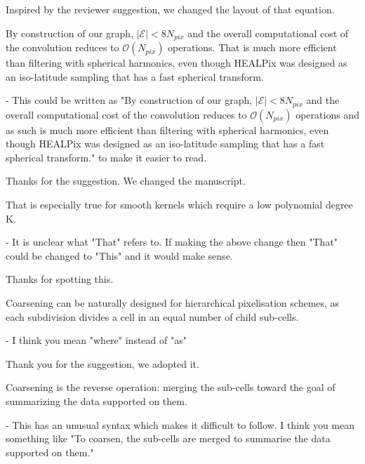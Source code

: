 \documentclass[12pt,a4paper]{article}
\newcommand{\nati}[1]{{\color[rgb]{.1,.6,.1}{NP: #1}}}
\newcommand{\todo}[1]{{\color[rgb]{.6,.1,.6}{TODO: #1}}}
\newcommand{\1}{\b{1}}              %
\newcommand{\0}{\b{0}}              %
\begin{document}
Inspired by the reviewer suggestion, we changed the layout of that equation.

\begin{mdframed}[style=comment]
By construction of our graph, $|\mathcal{E}| < 8N_{pix}$ and the overall computational cost of the convolution reduces to $\mathcal{O}(N_{pix})$ operations. That is much more efficient than filtering with spherical harmonics, even though HEALPix was designed as an iso-latitude sampling that has a fast spherical transform.

- This could be written as "By construction of our graph, $|\mathcal{E}| < 8N_{pix}$ and the overall computational cost of the convolution reduces to $\mathcal{O}(N_{pix})$ operations and as such is much more efficient than filtering with spherical harmonics, even though HEALPix was designed as an iso-latitude sampling that has a fast spherical transform." to make it easier to read.
\end{mdframed}

Thanks for the suggestion. We changed the manuscript.

\begin{mdframed}[style=comment]
That is especially true for smooth kernels which require a low polynomial degree K.

- It is unclear what "That" refers to. If making the above change then "That" could be changed to "This" and it would make sense.
\end{mdframed}

Thanks for spotting this.

\begin{mdframed}[style=comment]
Coarsening can be naturally designed for hierarchical pixelisation schemes, as each subdivision divides a cell in an equal number of child sub-cells.

- I think you mean "where" instead of "as"
\end{mdframed}

Thank you for the suggestion, we adopted it.

\begin{mdframed}[style=comment]
Coarsening is the reverse operation: merging the sub-cells toward the goal of summarizing the data supported on them.

- This has an unusual syntax which makes it difficult to follow. I think you mean something like "To coarsen, the sub-cells are merged to summarise the data supported on them."
\end{mdframed}
\end{document}
